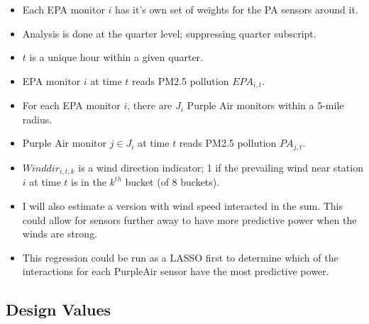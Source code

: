 \documentclass[12pt]{article}
\begin{document}
\begin{itemize}
\item Each EPA monitor $i$ has it's own set of weights for the PA sensors around it.
\item Analysis is done at the quarter level; suppressing quarter subscript.
\item $t$ is a unique hour within a given quarter.
\item EPA monitor $i$ at time $t$ reads PM2.5 pollution $EPA_{i,t}$.
\item For each EPA monitor $i$, there are $J_i$ Purple Air monitors within a 5-mile radius.
\item Purple Air monitor $j\in J_i$ at time $t$ reads PM2.5 pollution $PA_{j,t}$.
\item $Winddir_{i,t,k} $ is a wind direction indicator; 1 if the prevailing wind near station $i$ at time $t$ is in the $k^{th}$ bucket (of 8 buckets).
\item I will also estimate a version with wind speed interacted in the sum. This could allow for sensors further away to have more predictive power when the winds are strong.
\item This regression could be run as a LASSO first to determine which of the interactions for each PurpleAir sensor have the most predictive power.
\end{itemize}



% 
















\newpage
\subsection{Design Values}
\label{sec:design_values}
\end{document}

